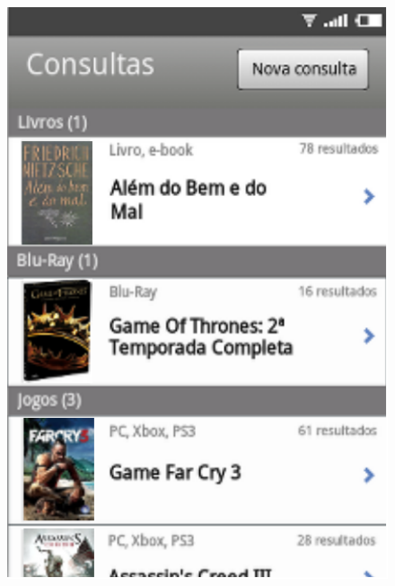 \documentclass[14pt,beamer]{beamer}
\begin{document}
\begin{frame}
    \begin{figure}
        \centering
        \includegraphics[scale=.45]{tela/TelaHistorico}
    \end{figure}
\end{frame}
\end{document}
